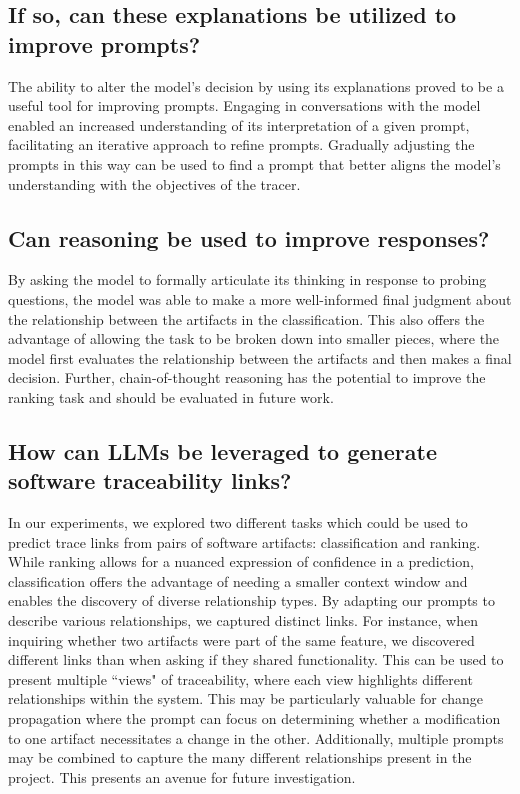 \subsection{If so, can these explanations be utilized to improve prompts?}
The ability to alter the model's decision by using its explanations proved to be a useful tool for improving prompts. Engaging in conversations with the model enabled an increased understanding of its interpretation of a given prompt, facilitating an iterative approach to refine prompts. Gradually adjusting the prompts in this way can be used to find a prompt that better aligns the model's understanding with the objectives of the tracer.


\subsection{Can reasoning be used to improve responses?}
By asking the model to formally articulate its thinking in response to probing questions, the model was able to make a more well-informed final judgment about the relationship between the artifacts in the classification. This also offers the advantage of allowing the task to be broken down into smaller pieces, where the model first evaluates the relationship between the artifacts and then makes a final decision. Further, chain-of-thought reasoning has the potential to improve the ranking task and should be evaluated in future work.


\subsection{How can LLMs be leveraged to generate
software traceability links?}
In our experiments, we explored two different tasks which could be used to predict trace links from pairs of software artifacts: classification and 
ranking. While ranking allows for a nuanced expression of confidence in a prediction, classification  offers the advantage of needing a smaller context window and enables the discovery of diverse relationship types. By adapting our prompts to describe various relationships, we captured distinct links. For instance, when inquiring whether two artifacts were part of the same feature, we discovered different links than when asking if they shared functionality. This can be used to present multiple ``views" of traceability, where each view highlights different relationships within the system. This may be particularly valuable for change propagation where the prompt can focus on determining whether a modification to one artifact necessitates a change in the other. Additionally, multiple prompts may be combined to capture the many different relationships present in the project. This presents an avenue for future investigation.

